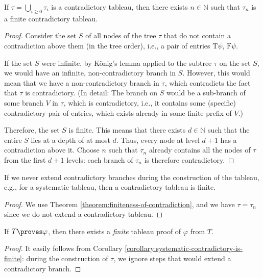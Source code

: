 \begin{theorem}\label{theorem:finiteness-of-contradiction}
    If $\tau = \bigcup_{i \geq 0} \tau_i$ is a contradictory tableau, then there exists $n \in \mathbb{N}$ such that $\tau_n$ is a finite contradictory tableau.
\end{theorem}
\begin{proof}
    Consider the set $S$ of all nodes of the tree $\tau$ that do not contain a contradiction above them (in the tree order), i.e., a pair of entries $\mathrm{T}\psi$, $\mathrm{F}\psi$.

    If the set $S$ were infinite, by König's lemma applied to the subtree $\tau$ on the set $S$, we would have an infinite, non-contradictory branch in $S$. However, this would mean that we have a non-contradictory branch in $\tau$, which contradicts the fact that $\tau$ is contradictory. (In detail: The branch on $S$ would be a sub-branch of some branch $V$ in $\tau$, which is contradictory, i.e., it contains some (specific) contradictory pair of entries, which exists already in some finite prefix of $V$.)

    Therefore, the set $S$ is finite. This means that there exists $d \in \mathbb{N}$ such that the entire $S$ lies at a depth of at most $d$. Thus, every node at level $d+1$ has a contradiction above it. Choose $n$ such that $\tau_n$ already contains all the nodes of $\tau$ from the first $d+1$ levels: each branch of $\tau_n$ is therefore contradictory.
\end{proof}

\begin{corollary}\label{corollary:systematic-contradictory-is-finite}
    If we never extend contradictory branches during the construction of the tableau, e.g., for a systematic tableau, then a contradictory tableau is finite.
\end{corollary}
\begin{proof}
We use Theorem \ref{theorem:finiteness-of-contradiction}, and we have $\tau = \tau_n$ since we do not extend a contradictory tableau.    
\end{proof}

\begin{corollary}\label{corollary:finiteness-of-proofs}
    If $T \proves \varphi$, then there exists a \emph{finite} tableau proof of $\varphi$ from $T$.
\end{corollary}
\begin{proof}
It easily follows from Corollary \ref{corollary:systematic-contradictory-is-finite}: during the construction of $\tau$, we ignore steps that would extend a contradictory branch.
\end{proof}

